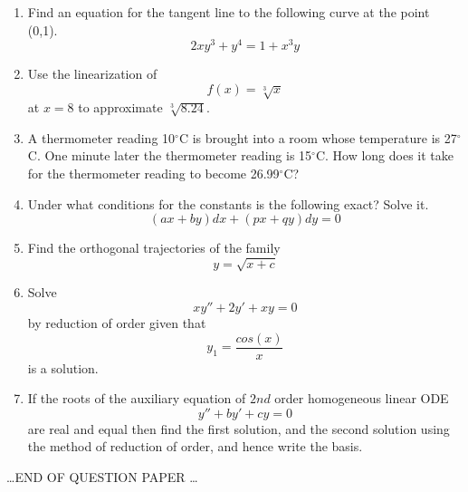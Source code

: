 \documentclass[12pt, a4paper]{article}
\begin{document}
\begin{large}
\begin{enumerate}


\item
Find an equation for the tangent line to the following curve at the point (0,1).
\begin{equation}
2xy^3 + y^4 = 1 + x^3y
\end{equation}

\item
Use the linearization of
\begin{equation}
 f(x) = \sqrt[3]{x} 
 \end{equation}
 at $x=8$ to approximate $\sqrt[3]{8.24}$.

\item
A thermometer reading 10$^{\circ}$C is brought into a room whose
temperature is 27$^{\circ}$C. One minute later the thermometer reading
is 15$^{\circ}$C. How long does it take for the thermometer reading
to become 26.99$^{\circ}$C?

\item
Under what conditions for the constants is the following exact?
Solve it. 
\begin{equation}
(ax + by)dx + (px + qy)dy = 0 
\end{equation}

\item
Find the orthogonal trajectories of the family \begin{equation} y = \sqrt{x+c}
\end{equation}

\item
Solve 
\begin{equation}
xy'' + 2y' + xy = 0
\end{equation}
by reduction of order given that  \begin{equation}
y_1 = \frac{cos(x)}{x} 
\end{equation}is a solution.

\item
If the roots of the auxiliary equation of $2nd$ order homogeneous linear ODE
\begin{equation}
y'' + by' + cy = 0
\end{equation} are real and equal then find the first solution, and the second solution using the method of reduction of order, and hence write the basis.


\end{enumerate}
\begin{center}
\dots END OF QUESTION PAPER \dots
\end{center}
\end{large}
\end{document}
